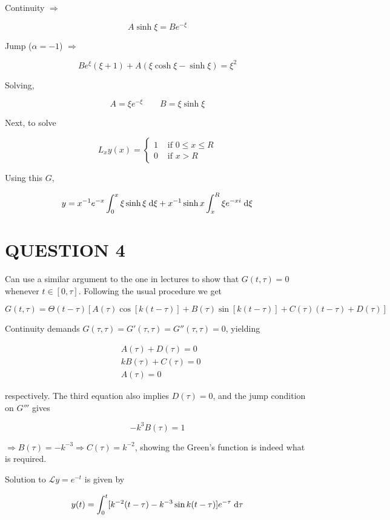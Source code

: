 \documentclass[a4paper]{article}
\begin{document}
Continuity $ \Rightarrow $

\[ A \sinh \xi  = B e^{-\xi}   \]

Jump ($ \alpha =-1 $) $  \Rightarrow $ 

\[ Be^{\xi}(\xi + 1) + A( \xi \cosh \xi - \sinh \xi) = \xi^{2}  \]

Solving,

\[ A = \xi e^{-\xi} \qquad B = \xi \sinh \xi  \]


Next, to solve 

\[ L_{x}y(x) = \begin{cases} 1  & \text{ if } 0 \leq x \leq R \\ 0 & \text{ if } x > R  \end{cases} \]

Using this $ G $,

\[ y = x^{-1}e^{-x} \int_{0}^{x} \xi \sinh \xi \; \mathrm{d} \xi + x^{-1} \sinh x \int_{x}^{R} \xi e^{-xi} \; \mathrm{d} \xi  \]





\section{QUESTION 4}

Can use a similar argument to the one in lectures to show that $ G(t,\tau) = 0 $ whenever $ t \in [0,\tau] $.
Following the usual procedure we get

\[ G(t,\tau)  =  \Theta ( t - \tau)[A(\tau) \cos[k(t - \tau)] + B(\tau)\sin[k(t - \tau)] + C(\tau) (t - \tau) + D(\tau)   ]  \]

Continuity demands $ G(\tau,\tau) = G'(\tau,\tau) = G''(\tau,\tau) = 0 $, yielding

\begin{align*}
& A(\tau) + D(\tau) = 0 \\
& kB(\tau) + C(\tau) = 0\\
& A(\tau) = 0 
\end{align*}

respectively. The third equation also implies $ D(\tau) = 0 $, and the jump condition on $ G''' $ gives

\[  - k^{3} B(\tau) = 1  \]

$ \Rightarrow  B(\tau) = -k^{-3} \Rightarrow C(\tau) = k^{-2}  $, showing the Green's function is indeed what is required. 

Solution to $ \mathcal{L}y = e^{-t} $ is given by

\begin{align*}
y(t) & = \int_{0}^{t} [k^{-2} (t - \tau) - k^{-3} \sin k(t-\tau) ]e^{-\tau} \; \mathrm{d} \tau    \\
\end{align*}
\end{document}
